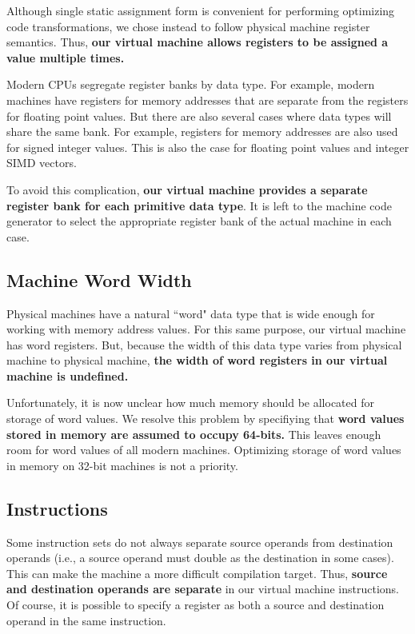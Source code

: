 Although single static assignment form is convenient for performing
optimizing code transformations, we chose instead to follow physical machine
register semantics. Thus, \textbf{our virtual machine allows
registers to be assigned a value multiple times.}

Modern CPUs segregate register banks by data type.
For example, modern machines have registers for memory addresses
that are separate from the registers for floating point values.
But there are also several cases where data types will share the same bank.
For example, registers for memory addresses are also used for signed integer
values. This is also the case for floating point values and integer SIMD vectors.

To avoid this complication,
\textbf{our virtual machine provides a separate register bank for
each primitive data type}.
It is left to the machine code generator to select the
appropriate register bank of the actual machine in each case.

\subsection{Machine Word Width}
\label{sec:word}

Physical machines have a natural ``word" data type that is wide enough
for working with memory address values. For this same purpose,
our virtual machine has word registers. But, because the width of this data type
varies from physical machine to physical machine, \textbf{the width of word registers in
our virtual machine is undefined.}

Unfortunately, it is now unclear how much
memory should be allocated for storage of word values.
We resolve this problem by specifiying that
\textbf{word values stored in memory are assumed to occupy 64-bits.}
This leaves enough room for word values of all modern machines.
Optimizing storage of word values in memory on 32-bit machines
is not a priority.

\subsection{Instructions}

Some instruction sets do not always separate source operands from
destination operands (i.e., a source operand must double as the destination
in some cases).
This can make the machine a more difficult compilation target.
Thus, \textbf{source and destination operands are separate} in our
virtual machine instructions.
Of course, it is possible to specify a register as both a source
and destination operand in the same instruction.

